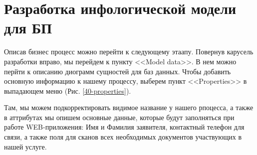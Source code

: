 \chapter{Разработка инфологической модели для БП}

Описав бизнес процесс можно перейти к следующему этаапу. Повернув карусель разработки
вправо, мы перейдем к пункту <<Model data>>. В нем можно перйти к описанию
диограмм сущностей для баз данных. Чтобы добавить основную информацию к нашему процессу,
выберем пункт <<Properties>> в выпадающем меню (Рис. \ref{40-properties}).

\clearpage

Там, мы можем подкорректировать видимое название у нашего рпоцесса, а также в
аттрибутах мы опишем основные данные, которые будут заполняться при работе WEB-приложения:
Имя и Фамилия заявителя, контактный телефон для связи, а также поля для
сканов всех необходимых документов участвующих в нашей услуге.

